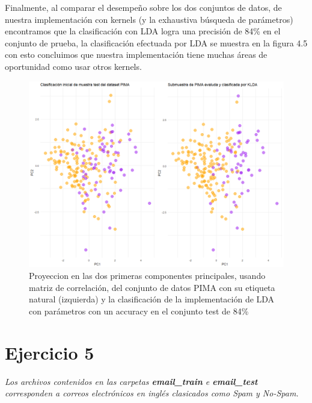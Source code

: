 \documentclass[paper=letter, fontsize=11pt]{scrartcl}
\numberwithin{equation}{section} %
\numberwithin{figure}{section} %
\numberwithin{table}{section} %
\begin{document}
 Finalmente, al comparar el desempeño sobre los dos conjuntos de datos, de nuestra implementación con kernels (y la exhaustiva búsqueda de parámetros) encontramos que la clasificación con LDA logra una precisión de 84\% en el conjunto de prueba, la clasificación efectuada por LDA se muestra en la figura 4.5 con esto concluimos que nuestra implementación tiene muchas áreas de oportunidad como usar otros kernels. 
\begin{figure}[H]
  \begin{center}
    \includegraphics[scale=0.45]{lda_pima.png}
    \caption{Proyeccion en las dos primeras componentes principales, usando matriz de correlación, del conjunto de datos PIMA con su etiqueta natural (izquierda) y la clasificación de la implementación de LDA con parámetros con un accuracy en el conjunto test de 84\% }
    \label{figura4_5}
  \end{center}
\end{figure}
\FloatBarrier


\section{Ejercicio 5}

\textit{Los archivos contenidos en las carpetas \textbf{email\_train} e \textbf{email\_test} corresponden a correos electrónicos en inglés clasicados como Spam y No-Spam. }\\
\end{document}

